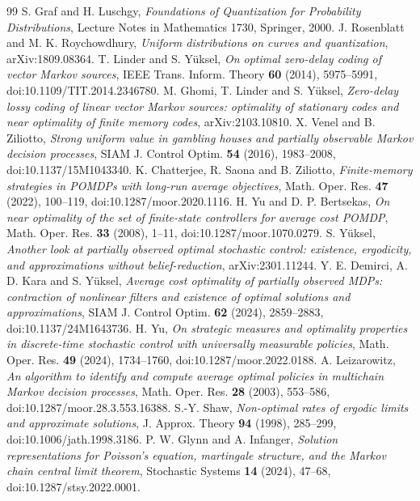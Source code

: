 \begin{thebibliography}{99}
 S. Graf and H. Luschgy, \emph{Foundations of Quantization for Probability Distributions}, Lecture Notes in Mathematics 1730, Springer, 2000.
 J. Rosenblatt and M. K. Roychowdhury, \emph{Uniform distributions on curves and quantization}, arXiv:1809.08364.
 T. Linder and S. Y\"uksel, \emph{On optimal zero-delay coding of vector Markov sources}, IEEE Trans. Inform. Theory \textbf{60} (2014), 5975--5991, doi:10.1109/TIT.2014.2346780.
 M. Ghomi, T. Linder and S. Y\"uksel, \emph{Zero-delay lossy coding of linear vector Markov sources: optimality of stationary codes and near optimality of finite memory codes}, arXiv:2103.10810.
 X. Venel and B. Ziliotto, \emph{Strong uniform value in gambling houses and partially observable Markov decision processes}, SIAM J. Control Optim. \textbf{54} (2016), 1983--2008, doi:10.1137/15M1043340.
 K. Chatterjee, R. Saona and B. Ziliotto, \emph{Finite-memory strategies in POMDPs with long-run average objectives}, Math. Oper. Res. \textbf{47} (2022), 100--119, doi:10.1287/moor.2020.1116.
 H. Yu and D. P. Bertsekas, \emph{On near optimality of the set of finite-state controllers for average cost POMDP}, Math. Oper. Res. \textbf{33} (2008), 1--11, doi:10.1287/moor.1070.0279.
 S. Y\"uksel, \emph{Another look at partially observed optimal stochastic control: existence, ergodicity, and approximations without belief-reduction}, arXiv:2301.11244.
 Y. E. Demirci, A. D. Kara and S. Y\"uksel, \emph{Average cost optimality of partially observed MDPs: contraction of nonlinear filters and existence of optimal solutions and approximations}, SIAM J. Control Optim. \textbf{62} (2024), 2859--2883, doi:10.1137/24M1643736.
 H. Yu, \emph{On strategic measures and optimality properties in discrete-time stochastic control with universally measurable policies}, Math. Oper. Res. \textbf{49} (2024), 1734--1760, doi:10.1287/moor.2022.0188.
 A. Leizarowitz, \emph{An algorithm to identify and compute average optimal policies in multichain Markov decision processes}, Math. Oper. Res. \textbf{28} (2003), 553--586, doi:10.1287/moor.28.3.553.16388.
 S.-Y. Shaw, \emph{Non-optimal rates of ergodic limits and approximate solutions}, J. Approx. Theory \textbf{94} (1998), 285--299, doi:10.1006/jath.1998.3186.
 P. W. Glynn and A. Infanger, \emph{Solution representations for Poisson's equation, martingale structure, and the Markov chain central limit theorem}, Stochastic Systems \textbf{14} (2024), 47--68, doi:10.1287/stsy.2022.0001.
\end{thebibliography}
